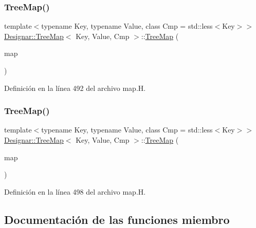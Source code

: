 \subsubsection{\texorpdfstring{Tree\+Map()}{TreeMap()}\hspace{0.1cm}{\footnotesize\ttfamily [6/7]}}
{\footnotesize\ttfamily template$<$typename Key, typename Value, class Cmp = std\+::less$<$\+Key$>$$>$ \\
\hyperlink{class_designar_1_1_tree_map}{Designar\+::\+Tree\+Map}$<$ Key, Value, Cmp $>$\+::\hyperlink{class_designar_1_1_tree_map}{Tree\+Map} (\begin{DoxyParamCaption}\item[{const \hyperlink{class_designar_1_1_tree_map}{Tree\+Map}$<$ Key, Value, Cmp $>$ \&}]{map }\end{DoxyParamCaption})\hspace{0.3cm}{\ttfamily [inline]}}



Definición en la línea 492 del archivo map.\+H.

\mbox{\label{class_designar_1_1_tree_map_a8c281295a0099d65d21f56f5787a8dd9}} 
\subsubsection{\texorpdfstring{Tree\+Map()}{TreeMap()}\hspace{0.1cm}{\footnotesize\ttfamily [7/7]}}
{\footnotesize\ttfamily template$<$typename Key, typename Value, class Cmp = std\+::less$<$\+Key$>$$>$ \\
\hyperlink{class_designar_1_1_tree_map}{Designar\+::\+Tree\+Map}$<$ Key, Value, Cmp $>$\+::\hyperlink{class_designar_1_1_tree_map}{Tree\+Map} (\begin{DoxyParamCaption}\item[{\hyperlink{class_designar_1_1_tree_map}{Tree\+Map}$<$ Key, Value, Cmp $>$ \&\&}]{map }\end{DoxyParamCaption})\hspace{0.3cm}{\ttfamily [inline]}}



Definición en la línea 498 del archivo map.\+H.



\subsection{Documentación de las funciones miembro}
\mbox{\label{class_designar_1_1_tree_map_a62214ac5be4a1d8d71e51e9b1a62d27a}} 
